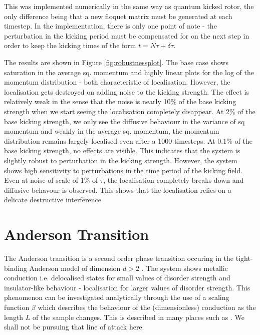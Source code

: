 \documentclass[twocolumn]{report}
\begin{document}
This was implemented numerically in the same way as quantum kicked rotor,
the only difference being that a new floquet matrix must be generated at
each timestep. In the implementation, there is only one point of note - the
perturbation in the kicking period must be compensated for on the next step
in order to keep the kicking times of the form $t = N\tau + \delta \tau$.

The results are shown in Figure \ref{fig:robustnessplot}. The base case
shows saturation in the average sq. momentum and highly linear plots
for the log of the momentum distribution - both characteristic of
localisation. However, the localisation gets destroyed on adding noise
to the kicking strength. The effect is relatively weak in the sense that
the noise is nearly 10\% of the base kicking strength when we start seeing
the localisation completely disappear. At 2\% of the base kicking strength,
we only see the diffusive behaviour in the variance of sq momentum and
weakly in the average sq. momentum, the momentum distribution remains
largely localised even after a 1000 timesteps. At 0.1\% of the base
kicking strength, no effects are visible. This indicates that the
system is slightly robust to perturbation in the kicking strength.
However, the system shows high sensitivity to perturbations in the time
period of the kicking field. Even at noise of scale of 1\% of $\tau$,
the localisation completely breaks down and diffusive behavour is
observed. This shows that the localisation relies on a delicate
destructive interference.

\section{Anderson Transition}
The Anderson transition is a second order phase transition occuring in the
tight-binding Anderson model of dimension $d > 2$ \cite{muller_disorder_2016}.
The system shows metallic conduction i.e. delocalised states for small values
of disorder strength and insulator-like behaviour - localisation for larger
values of disorder strength. This phenomenon can be investigated analytically
through the use of a scaling function $\beta$ which describes the behaviour
of the (dimensionless) conduction as the length $L$ of the sample changes.
This is described in many places such as \cite{muller_disorder_2016}. We
shall not be pursuing that line of attack here.
\end{document}
